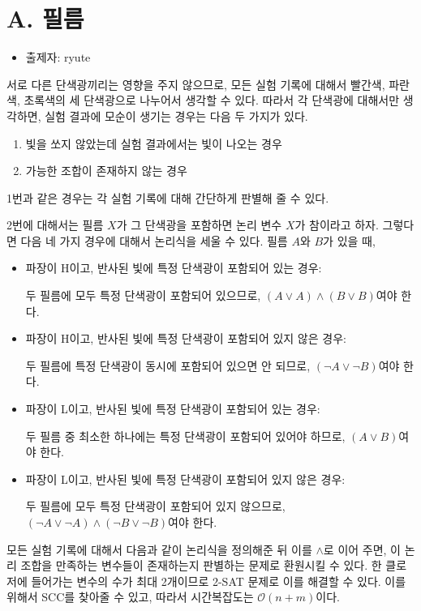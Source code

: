 \documentclass{article}
\begin{document}
	\section{A. 필름}
	\begin{itemize}
		\item 출제자: ryute
	\end{itemize}
	서로 다른 단색광끼리는 영향을 주지 않으므로, 모든 실험 기록에 대해서 빨간색, 파란색, 초록색의 세 단색광으로 나누어서 생각할 수 있다. 따라서 각 단색광에 대해서만 생각하면, 실험 결과에 모순이 생기는 경우는 다음 두 가지가 있다.
	\begin{enumerate}
		\item 빛을 쏘지 않았는데 실험 결과에서는 빛이 나오는 경우
		\item 가능한 조합이 존재하지 않는 경우
	\end{enumerate}
	1번과 같은 경우는 각 실험 기록에 대해 간단하게 판별해 줄 수 있다.
	
	2번에 대해서는 필름 $X$가 그 단색광을 포함하면 논리 변수 $X$가 참이라고 하자. 그렇다면 다음 네 가지 경우에 대해서 논리식을 세울 수 있다. 필름 $A$와 $B$가 있을 때, 
	\begin{itemize}
		\item 파장이 H이고, 반사된 빛에 특정 단색광이 포함되어 있는 경우:
		
		두 필름에 모두 특정 단색광이 포함되어 있으므로, $(A \lor A) \land (B \lor B)$여야 한다.
		\item 파장이 H이고, 반사된 빛에 특정 단색광이 포함되어 있지 않은 경우:
		
		두 필름에 특정 단색광이 동시에 포함되어 있으면 안 되므로, $(\lnot A \lor \lnot B)$여야 한다.
		
		\item 파장이 L이고, 반사된 빛에 특정 단색광이 포함되어 있는 경우:
		
		두 필름 중 최소한 하나에는 특정 단색광이 포함되어 있어야 하므로, $(A \lor B)$여야 한다.
		
		\item 파장이 L이고, 반사된 빛에 특정 단색광이 포함되어 있지 않은 경우:
		
		두 필름에 모두 특정 단색광이 포함되어 있지 않으므로, $(\lnot A \lor \lnot A) \land (\lnot B \lor \lnot B)$여야 한다.
		
	\end{itemize}	
	모든 실험 기록에 대해서 다음과 같이 논리식을 정의해준 뒤 이를 $\land$로 이어 주면, 이 논리 조합을 만족하는 변수들이 존재하는지 판별하는 문제로 환원시킬 수 있다. 한 클로저에 들어가는 변수의 수가 최대 2개이므로 2-SAT 문제로 이를 해결할 수 있다. 이를 위해서 SCC를 찾아줄 수 있고, 따라서 시간복잡도는 $\mathcal{O}(n+m)$이다.
	\newpage
\end{document}

